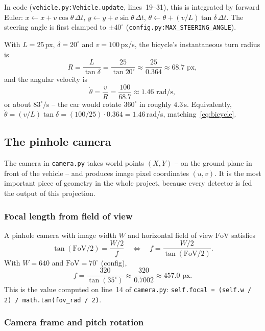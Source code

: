 In code (\texttt{vehicle.py:Vehicle.update}, lines~19--31), this is
integrated by forward Euler: $x\leftarrow x + v\cos\theta\,\Delta t$,
$y\leftarrow y + v\sin\theta\,\Delta t$,
$\theta\leftarrow\theta + (v/L)\tan\delta\,\Delta t$. The steering
angle is first clamped to $\pm 40^\circ$ (\texttt{config.py:MAX\_STEERING\_ANGLE}).

\begin{example}
With $L=25$\,px, $\delta=20^\circ$ and $v=100$\,px/s, the bicycle's
instantaneous turn radius is
\[
R = \frac{L}{\tan\delta} = \frac{25}{\tan 20^\circ}\approx \frac{25}{0.364}\approx 68.7\text{ px},
\]
and the angular velocity is
\[
\dot\theta = \frac{v}{R} = \frac{100}{68.7}\approx 1.46\text{ rad/s},
\]
or about $83^\circ/$s -- the car would rotate $360^\circ$ in roughly
$4.3$\,s. Equivalently, $\dot\theta = (v/L)\tan\delta = (100/25)\cdot
0.364 = 1.46$\,rad/s, matching~\eqref{eq:bicycle}.
\end{example}

\subsection{The pinhole camera}

The camera in \texttt{camera.py} takes world points $(X,Y)$ -- on the
ground plane in front of the vehicle -- and produces image pixel
coordinates $(u,v)$. It is the most important piece of geometry in the
whole project, because every detector is fed the output of this
projection.

\subsubsection{Focal length from field of view}

A pinhole camera with image width $W$ and horizontal field of view
$\text{FoV}$ satisfies
\begin{equation}
\tan(\text{FoV}/2) = \frac{W/2}{f}\quad\Longleftrightarrow\quad
f = \frac{W/2}{\tan(\text{FoV}/2)}.
\label{eq:focal}
\end{equation}
With $W=640$ and $\text{FoV}=70^\circ$ (config),
\[
f = \frac{320}{\tan(35^\circ)}\approx\frac{320}{0.7002}\approx 457.0\text{ px}.
\]
This is the value computed on line~14 of \texttt{camera.py}:
\texttt{self.focal = (self.w / 2) / math.tan(fov\_rad / 2)}.

\subsubsection{Camera frame and pitch rotation}

